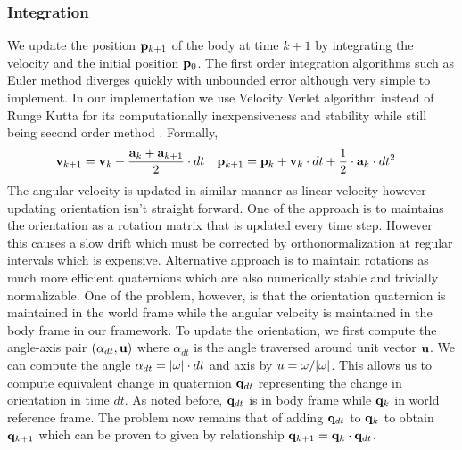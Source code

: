 \documentclass[graybox]{svmult}
\begin{document}
	\subsubsection{Integration}
	We update the position ${\bf p}_{k+1}$ of the body at time $k+1$ by integrating the velocity and the initial position ${\bf p}_{0}$. The first order integration algorithms such as Euler method diverges quickly with unbounded error although very simple to implement. In our implementation we use Velocity Verlet algorithm instead of Runge Kutta for its computationally inexpensiveness and stability while still being second order method \cite{Herman2017}. Formally, 
	\begin{align*}
	{\bf v}_{k+1} &= {\bf v}_{k} + \frac{{\bf a}_{k} + {\bf a}_{k+1}}{2} \cdot dt &
	{\bf p}_{k+1} &= {\bf p}_{k} + {\bf v}_{k} \cdot dt + \frac{1}{2} \cdot {\bf a}_{k} \cdot dt^2
	\end{align*}
	The angular velocity is updated in similar manner as linear velocity however updating orientation isn't straight forward. One of the approach is to maintains the orientation as a rotation matrix that is updated every time step. However this causes a slow drift which must be corrected by orthonormalization at regular intervals which is expensive. Alternative approach is to maintain rotations as much more efficient quaternions which are also numerically stable and trivially normalizable. One of the problem, however, is that the orientation quaternion is maintained in the world frame while the angular velocity is maintained in the body frame in our framework. To update the orientation, we first compute the angle-axis pair $(\alpha_{dt}, {\bf u})$ where $\alpha_{dt}$ is the angle traversed around unit vector ${\bf u}$. We can compute the angle $\alpha_{dt} = |{\bf \omega}| \cdot dt$ and axis by $u = {\bf \omega} / |\omega|$. This allows us to compute equivalent change in quaternion ${\bf q}_{dt}$ representing the change in orientation in time $dt$. As noted before, ${\bf q}_{dt}$ is in body frame while ${\bf q}_{k}$ in world reference frame. The problem now remains that of adding ${\bf q}_{dt}$ to ${\bf q}_{k}$ to obtain ${\bf q}_{k+1}$ which can be proven to given by relationship ${\bf q}_{k+1} = {\bf q}_{k} \cdot {\bf q}_{dt}$.
	
\end{document}

